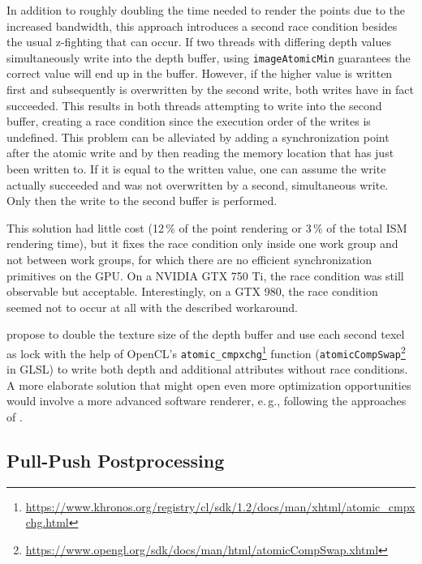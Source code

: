 In addition to roughly doubling the time needed to render the points due to the increased bandwidth, this approach introduces a second race condition besides the usual z-fighting that can occur. If two threads with differing depth values simultaneously write into the depth buffer, using \texttt{imageAtomicMin} guarantees the correct value will end up in the buffer. However, if the higher value is written first and subsequently is overwritten by the second write, both writes have in fact succeeded. This results in both threads attempting to write into the second buffer, creating a race condition since the execution order of the writes is undefined. This problem can be alleviated by adding a synchronization point after the atomic write and by then reading the memory location that has just been written to. If it is equal to the written value, one can assume the write actually succeeded and was not overwritten by a second, simultaneous write. Only then the write to the second buffer is performed.

This solution had little cost (12\,\% of the point rendering or 3\,\% of the total ISM rendering time), but it fixes the race condition only inside one work group and not between work groups, for which there are no efficient synchronization primitives on the GPU. On a NVIDIA GTX 750 Ti, the race condition was still observable but acceptable. Interestingly, on a GTX 980, the race condition seemed not to occur at all with the described workaround.

\citet{Günther:2013:AcceleratedPointCloudRendering} propose to double the texture size of the depth buffer and use each second texel as lock with the help of OpenCL's \texttt{atomic\_cmpxchg}\footnote{\url{https://www.khronos.org/registry/cl/sdk/1.2/docs/man/xhtml/atomic_cmpxchg.html}} function (\texttt{atomicCompSwap}\footnote{\url{https://www.opengl.org/sdk/docs/man/html/atomicCompSwap.xhtml}} in GLSL) to write both depth and additional attributes without race conditions. A more elaborate solution that might open  even more optimization opportunities would involve a more advanced software renderer, e.\,g., following the approaches of \citet{Laine:2011:SoftwareRasterization}.


\subsection{Pull-Push Postprocessing}
\label{sec:impl:pullPushPostprocessing}

